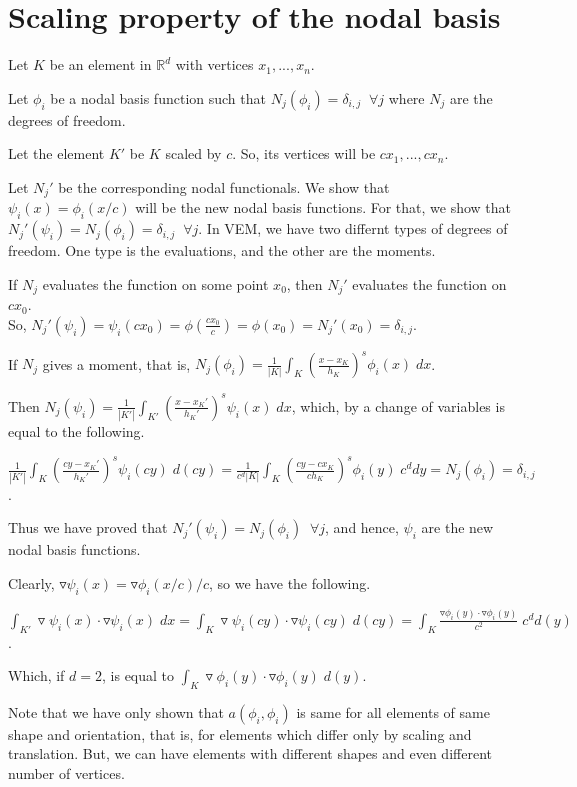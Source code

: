 \documentclass[12pt]{article}
\begin{document}
\section{Scaling property of the nodal basis}

Let $K$ be an element in $\mathbb{R}^d$ with vertices $x_1,...,x_n$. 

Let $\phi_i$ be a nodal basis function such that $N_j(\phi_i)=\delta_{i,j} \;\;\forall j$ where $N_j$ are the degrees of freedom. 

Let the element $K'$ be $K$ scaled by $c$. So, its vertices will be $cx_1,...,cx_n$. 

Let $N_j'$ be the corresponding nodal functionals. We show that $\psi_i(x)=\phi_i(x/c)$ will be the new nodal basis functions. For that, we show that $N_j'(\psi_i)=N_j(\phi_i)=\delta_{i,j} \;\;\forall j$. In VEM, we have two differnt types of degrees of freedom. One type is the evaluations, and the other are the moments.


If $N_j$ evaluates the function on some point $x_0$, then $N_j'$ evaluates the function on $cx_0$.
\\So, $N_j'(\psi_i) = \psi_i(cx_0) = \phi(\frac{cx_0}{c}) = \phi(x_0) = N_j'(x_0) = \delta_{i,j}$.


If $N_j$ gives a moment, that is, $N_j(\phi_i)=\frac{1}{|K|}\int_K (\frac{x-x_K}{h_K})^s\phi_i(x)\;dx$.

Then $N_j(\psi_i)=\frac{1}{|K'|}\int_{K'} (\frac{x-x_K'}{h_K'})^s\psi_i(x)\;dx$, which, by a change of variables is equal to the following. 

$\frac{1}{|K'|}\int_K (\frac{cy-x_K'}{h_K'})^s\psi_i(cy)\;d(cy)=\frac{1}{c^d|K|}\int_K (\frac{cy-cx_K}{ch_K})^s\phi_i(y)\;c^ddy=N_j(\phi_i)=\delta_{i,j}$.

Thus we have proved that $N_j'(\psi_i)=N_j(\phi_i)\;\;\forall j$, and hence, $\psi_i$ are the new nodal basis functions.

Clearly, $\triangledown\psi_i(x)=\triangledown\phi_i(x/c)/c$, so we have the following.

$\int_{K'} \triangledown\psi_i(x) \cdot\triangledown\psi_i(x) \;dx
=\int_{K} \triangledown\psi_i(cy) \cdot\triangledown\psi_i(cy) \;d(cy)
=\int_K \frac{\triangledown\phi_i(y) \cdot \triangledown\phi_i(y)}{c^2}\;c^dd(y)$.

Which, if $d=2$, is equal to $\int_K \triangledown\phi_i(y) \cdot \triangledown\phi_i(y)\;d(y)$.

Note that we have only shown that $a(\phi_i,\phi_i)$ is same for all elements of same shape and orientation, that is, for elements which differ only by scaling and translation. But, we can have elements with different shapes and even different number of vertices.
\end{document}
